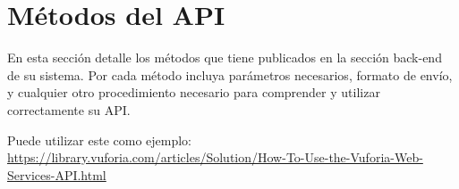 \chapter{Métodos del API}
En esta sección detalle los métodos que tiene publicados en la sección back-end de su sistema.
Por cada método incluya parámetros necesarios, formato de envío, y cualquier otro procedimiento necesario para comprender y utilizar correctamente su API. 

Puede utilizar este como ejemplo:
\url{https://library.vuforia.com/articles/Solution/How-To-Use-the-Vuforia-Web-Services-API.html}


